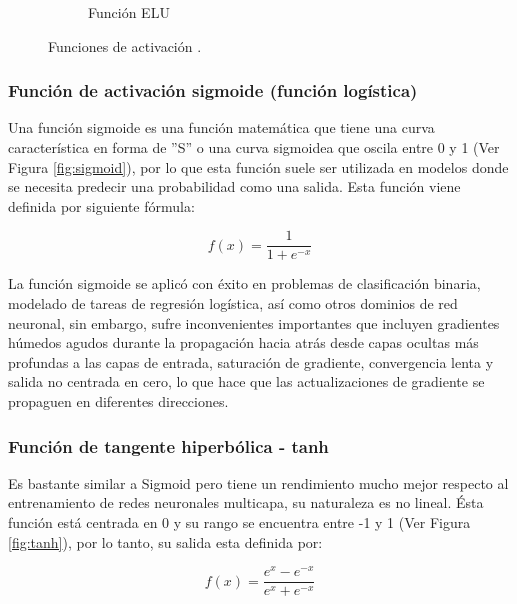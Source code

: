 \begin{figure}
{\begin{varwidth}{\textwidth}
\begin{subfigure}[h]{0.45\textwidth}
            \caption{Funci\'{o}n ELU}
            \label{fig:elu}
        \end{subfigure}
        \end{varwidth}}
        \caption{Funciones de activaci\'{o}n \protect\cite{Reference69}.}
        
		\label{fig:funciones_activacion}
    \end{figure}
    
\subsubsection{Funci\'{o}n de activaci\'{o}n sigmoide (funci\'{o}n log\'{i}stica)}

Una funci\'{o}n sigmoide es una funci\'{o}n matem\'{a}tica que tiene una curva caracter\'{i}stica en forma de ''S'' o una curva sigmoidea que oscila entre 0 y 1 (Ver Figura \ref{fig:sigmoid}), por lo que esta funci\'{o}n suele ser utilizada en modelos donde se necesita predecir una probabilidad como una salida. Esta funci\'{o}n viene definida por siguiente f\'{o}rmula:

\begin{equation}
f(x) = \frac{1}{1+e^{-x}}
\end{equation}

La funci\'{o}n sigmoide se aplic\'{o} con éxito en problemas de clasificación binaria, modelado de tareas de regresión logística, así como otros dominios de red neuronal, sin embargo, sufre inconvenientes importantes que incluyen gradientes húmedos agudos durante la propagación hacia atrás desde capas ocultas más profundas a las capas de entrada, saturación de gradiente, convergencia lenta y salida no centrada en cero, lo que hace que las actualizaciones de gradiente se propaguen en diferentes direcciones.

\subsubsection{Funci\'{o}n de tangente hiperb\'{o}lica - tanh}

Es bastante similar a Sigmoid pero tiene un rendimiento mucho mejor respecto al entrenamiento de redes neuronales multicapa, su naturaleza es no lineal. \'{E}sta funci\'{o}n est\'{a} centrada en 0 y su rango se encuentra entre -1 y 1 (Ver Figura \ref{fig:tanh}), por lo tanto, su salida esta definida por:

\begin{equation}
f(x)=\frac{e^{x}-e^{-x}}{e^{x}+e^{-x}}
\end{equation}
    
